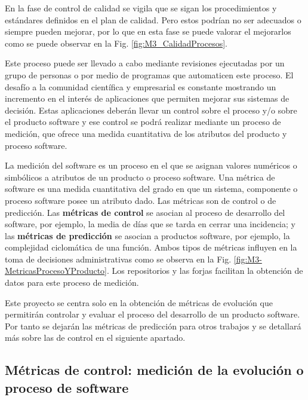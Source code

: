 En la fase de control de calidad se vigila que se sigan los procedimientos y estándares definidos en el plan de calidad. Pero estos podrían no ser adecuados o siempre pueden mejorar, por lo que en esta fase se puede valorar el mejorarlos como se puede observar en la Fig. \ref{fig:M3_CalidadProcesos}.


Este proceso puede ser llevado a cabo mediante revisiones ejecutadas por un grupo de personas o por medio de programas que automaticen este proceso. El  desafío a la comunidad científica y empresarial es constante mostrando un incremento en el interés de aplicaciones que permiten  mejorar sus sistemas de decisión. Estas aplicaciones deberán llevar un control sobre el proceso y/o sobre el producto software y ese control se podrá realizar mediante un proceso de medición, que ofrece una medida cuantitativa de los atributos del producto y proceso software. 

La medición del software es un proceso en el que se asignan valores numéricos o simbólicos a atributos de un producto o proceso software. Una métrica de software es una medida cuantitativa del grado en que un sistema, componente o proceso software posee un atributo dado. Las métricas son de control o de predicción. Las \textbf{métricas de control} se asocian al proceso de desarrollo del software, por ejemplo, la media de días que se tarda en cerrar una incidencia; y las \textbf{métricas de predicción} se asocian a productos software, por ejemplo, la complejidad ciclomática de una función. Ambos tipos de métricas influyen en la toma de decisiones administrativas como se observa en la Fig. \ref{fig:M3-MetricasProcesoYProducto}. Los repositorios y las forjas facilitan la obtención de datos para este proceso de medición.


Este proyecto se centra solo en la obtención de métricas de evolución que permitirán controlar y evaluar el proceso del desarrollo de un producto software. Por tanto se dejarán las métricas de predicción para otros trabajos y se detallará más sobre las de control en el siguiente apartado.

\subsection{Métricas de control: medición de la evolución o proceso de software}\label{sect:3_3_2_MetricasControl}

